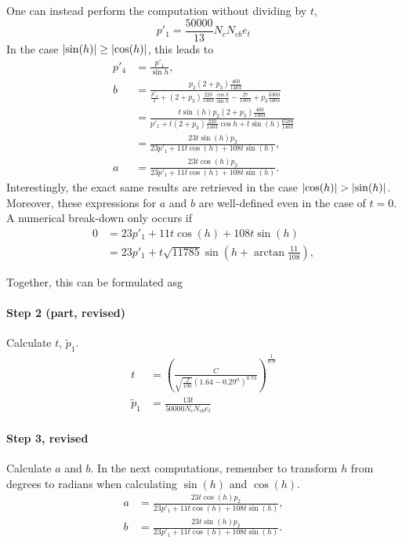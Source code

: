 \documentclass[twocolumn]{scrartcl}
\DeclarePairedDelimiter\abs{\lvert}{\rvert}%
\begin{document}
One can instead perform the computation without dividing by $t$,
\[
  p'_1 = \frac{50000}{13} N_c N_{cb} e_t
\]
In the case $\abs{\sin(h)} \ge \abs{\cos(h)}$, this leads to
\begin{align*}
  p'_4 &= \frac{p'_1}{\sin h},\\
  b &= \frac{p_2 (2+p_3) \frac{460}{1403}}{\frac{p'_4}{t} + (2+p_3) \frac{220}{1403} \frac{\cos h}{\sin h} - \frac{27}{1403} + p_3 \frac{6300}{1403}}\\
   &= \frac{t \sin(h) p_2 (2+p_3) \frac{460}{1403}}{p'_1 + t (2+p_3) \frac{220}{1403} \cos h + t \sin(h) \frac{6588}{1403}}\\
   &= \frac{23 t \sin(h) p_2}{23 p'_1 + 11 t \cos(h) + 108 t \sin(h)},\\
  a &= \frac{23 t \cos(h) p_2}{23 p'_1 + 11 t \cos(h) + 108 t \sin(h)}.
\end{align*}
Interestingly, the exact same results are retrieved in the case $\abs{\cos(h)}
> \abs{\sin(h)}$. Moreover, these expressions for $a$ and $b$ are well-defined
even in the case of $t=0$.
A numerical break-down only occurs if
\begin{align*}
 0 &= 23 p'_1 + 11 t \cos(h) + 108 t \sin(h)\\
   &= 23 p'_1 + t \sqrt{11785} \sin\left(h + \arctan\frac{11}{108}\right),
\end{align*}


Together, this can be formulated asg

\paragraph{Step 2 (part, revised)}{Calculate $t$, $\tilde{p}_1$.
\begin{align*}
  t &= \left(\frac{C}{\sqrt{\frac{J}{100}} {(1.64 - 0.29^n)}^{0.73}}\right)^\frac{1}{0.9}\\
  \tilde{p}_1 &= \frac{13 t}{50000 N_c N_{cb} e_t}
\end{align*}
}
\paragraph{Step 3, revised}{Calculate $a$ and $b$.
In the next computations, remember to transform $h$ from degrees to radians
when calculating $\sin(h)$ and $\cos(h)$.
\begin{align*}
  a &= \frac{23 t \cos(h) p_2}{23 p'_1 + 11 t \cos(h) + 108 t \sin(h)},\\
  b &= \frac{23 t \sin(h) p_2}{23 p'_1 + 11 t \cos(h) + 108 t \sin(h)}.
\end{align*}}
\end{document}
